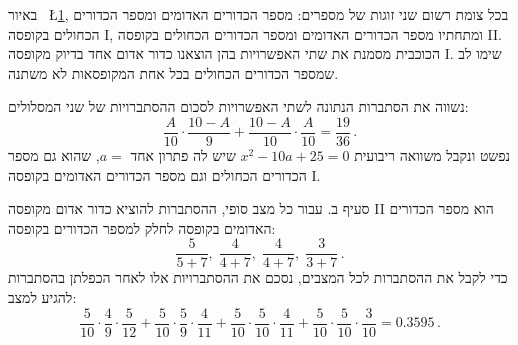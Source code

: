 \documentclass[12pt,a4paper]{article}
\begin{document}
באיור~%
\L{\ref{fig.summer-2017b.1}},
בכל צומת רשום שני זוגות של מספרים: מספר הכדורים האדומים ומספר הכדורים הכחולים בקופסה
\textsf{I},
ומתחתיו מספר הכדורים האדומים ומספר הכדורים הכחולים בקופסה
\textsf{II}.
הכוכבית מסמנת את שתי האפשרויות בהן הוצאנו כדור אדום אחד בדיוק מקופסה
\textsf{I}.
שימו לב שמספר הכדורים הכחולים בכל אחת המקופסאות לא משתנה.
\begin{figure}
\begin{center}
\caption{}\label{fig.summer-2017b.1}
\end{center}
\end{figure}
נשווה את הסתברות הנתונה לשתי האפשרויות לסכום ההסתברויות של שני המסלולים:
\[
\frac{A}{10}\cdot\frac{10-A}{9} + \frac{10-A}{10}\cdot\frac{A}{10} = \frac{19}{36}\,.
\]
נפשט ונקבל משוואה ריבועית 
$x^2-10a+25=0$
שיש לה פתרון אחד
$a=$,
שהוא גם מספר הכדורים הכחולים  וגם מספר הכדורים האדומים בקופסה
\textsf{I}.

סעיף ב. עבור כל מצב סופי, ההסתברות להוציא כדור אדום מקופסה
\textsf{II}
הוא מספר הכדורים האדומים בקופסה לחלק למספר הכדורים בקופסה:
\[
\frac{5}{5+7},\; \frac{4}{4+7},\; \frac{4}{4+7},\; \frac{3}{3+7}\,.
\]
כדי לקבל את ההסתברות לכל המצבים, נסכם את ההסתברויות אלו לאחר הכפלתן בהסתברות להגיע למצב:
\[
\frac{5}{10}\cdot\frac{4}{9}\cdot\frac{5}{12}+\frac{5}{10}\cdot\frac{5}{9}\cdot\frac{4}{11}+\frac{5}{10}\cdot\frac{5}{10}\cdot\frac{4}{11}+\frac{5}{10}\cdot\frac{5}{10}\cdot\frac{3}{10}=0.3595\,.
\]
\end{document}
